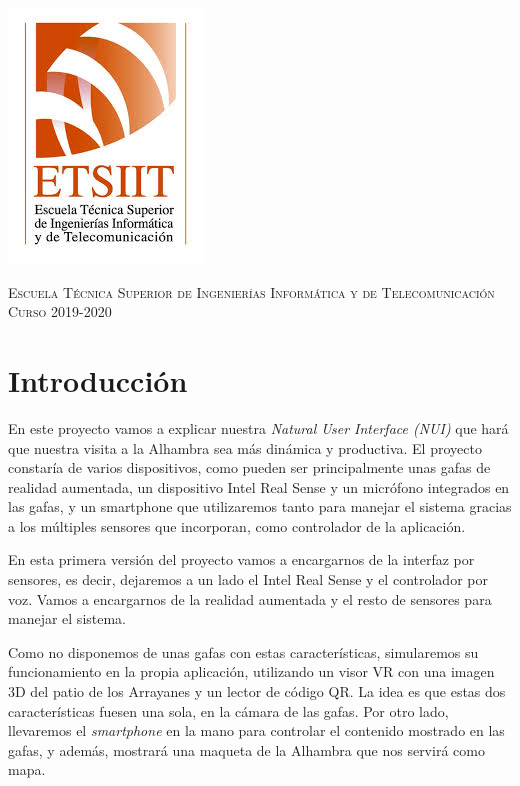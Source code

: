 \documentclass[11pt,a4paper]{article}
\begin{document}
\begin{titlepage}
\begin{minipage}{\textwidth}
\includegraphics[scale=0.3]{img/etsiit.jpeg}

\vspace{0.5cm}
\textsc{Escuela Técnica Superior de Ingenierías Informática y de Telecomunicación}\\
\vspace{0.5cm}
\textsc{Curso 2019-2020}
\end{minipage}
\end{titlepage}

\tableofcontents
\thispagestyle{empty}				%

\newpage

\setlength{\parskip}{1em}


\section{Introducción}
En este proyecto vamos a explicar nuestra \textit{Natural User Interface (NUI)} que hará que nuestra visita a la Alhambra sea más
dinámica y productiva. El proyecto constaría de varios dispositivos, como pueden ser principalmente unas gafas de realidad aumentada,
un dispositivo Intel Real Sense y un micrófono integrados en las gafas, y un smartphone que utilizaremos tanto para manejar el sistema
gracias a los múltiples sensores que incorporan, como controlador de la aplicación.

En esta primera versión del proyecto vamos a encargarnos de la interfaz por sensores, es decir, dejaremos a un lado el Intel Real Sense
y el controlador por voz. Vamos a encargarnos de la realidad aumentada y el resto de sensores para manejar el sistema.

Como no disponemos de unas gafas con estas características, simularemos su funcionamiento en la propia aplicación, utilizando un visor
VR con una imagen 3D del patio de los Arrayanes y un lector de código QR. La idea es que estas dos características fuesen una sola, en
la cámara de las gafas. Por otro lado, llevaremos el \textit{smartphone} en la mano para controlar el contenido mostrado en las gafas, y
además, mostrará una maqueta de la Alhambra que nos servirá como mapa.
\end{document}
